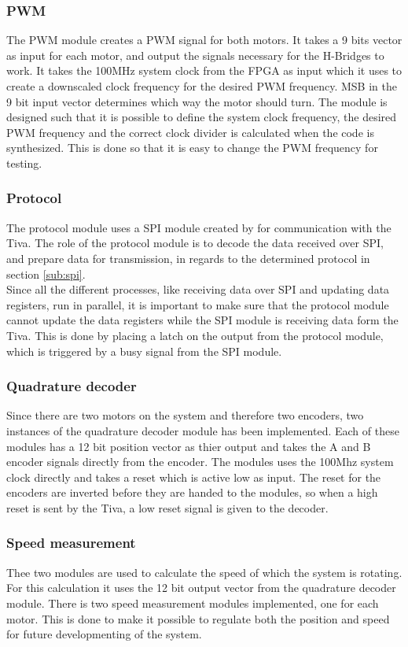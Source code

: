 \documentclass[../../../main]{subfiles}
\begin{document}
\subsubsection{PWM}
The PWM module creates a PWM signal for both motors. It takes a 9 bits vector as input for each motor, and output the signals necessary for the H-Bridges to work.
It takes the 100MHz system clock from the FPGA as input which it uses to create a downscaled clock frequency for the desired PWM frequency.
MSB in the 9 bit input vector determines which way the motor should turn.
The module is designed such that it is possible to define the system clock frequency, the desired PWM frequency and the correct clock divider is calculated when the code is synthesized.
This is done so that it is easy to change the PWM frequency for testing.
\subsubsection{Protocol}
The protocol module uses a SPI module created by \cite{spi_git_module} for communication with the Tiva.
The role of the protocol module is to decode the data received over SPI, and prepare data for transmission, in regards to the determined protocol in section \ref{sub:spi}.
\\
Since all the different processes, like receiving data over SPI and updating data registers, run in parallel, it is important to make sure that the protocol module cannot update the data registers while the SPI module is receiving data form the Tiva.
This is done by placing a latch on the output from the protocol module, which is triggered by a busy signal from the SPI module.

\subsubsection{Quadrature decoder}
\label{subsubsec:Qdecoder_implement}
Since there are two motors on the system and therefore two encoders, two instances of the quadrature decoder module has been implemented.
Each of these modules has a 12 bit position vector as thier output and takes the A and B encoder signals directly from the encoder. The modules uses the 100Mhz system clock directly and takes a reset which is active low as input.
The reset for the encoders are inverted before they are handed to the modules, so when a high reset is sent by the Tiva, a low reset signal is given to the decoder.


\subsubsection{Speed measurement}
Thee two modules are used to calculate the speed of which the system is rotating. For this calculation it uses the 12 bit output vector from the quadrature decoder module.
There is two speed measurement modules implemented, one for each motor.
This is done to make it possible to regulate both the position and speed for future developmenting of the system.
\end{document}
